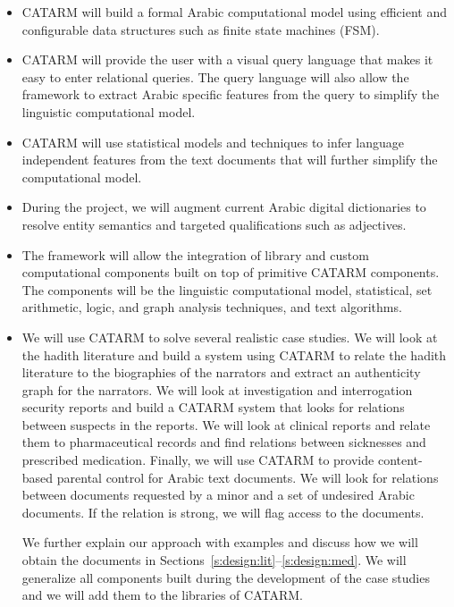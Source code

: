 \documentclass[12pt]{article}
\begin{document}
\begin{itemize}\itemsep0pt
\item CATARM will build a formal Arabic computational model
using efficient and configurable data structures such as 
finite state machines (FSM). 
\item CATARM will provide the user with a visual query 
language that makes it easy to enter relational queries. 
The query language will also allow the framework to extract Arabic
specific features from the query to simplify the linguistic 
computational model. 
\item CATARM will use statistical models and techniques
to infer language independent features from the text documents
that will further simplify the computational model. 
\item During the project, we will augment current Arabic digital 
dictionaries to resolve entity semantics and targeted 
qualifications such as adjectives.
\item The framework will allow the integration of library and 
custom computational components built on top of primitive
CATARM components. 
The components will be the linguistic computational model,
statistical, set arithmetic, logic,
and graph analysis techniques, and  text algorithms.
\item We will use CATARM to solve several realistic case studies.
We will look at the hadith literature and build a system using
CATARM to relate the hadith literature to the biographies of the
narrators and extract an authenticity graph for the narrators.
We will look at investigation and interrogation security reports
and build a CATARM system that looks for relations between suspects
in the reports. 
We will look at clinical reports and relate them to pharmaceutical 
records and find relations between sicknesses and prescribed medication. 
Finally, we will use CATARM to provide content-based parental control
for Arabic text documents. We will look for 
relations between documents requested by a minor and
a set of undesired Arabic documents. 
If the relation is strong, we will flag access to
the documents. 

We further explain our approach with examples and discuss 
how we will obtain the documents 
in Sections~\ref{s:design:lit}--\ref{s:design:med}.
We will generalize all components built during the development 
of the case studies and we will add them to 
the libraries of CATARM. 
\end{itemize}
\end{document}
